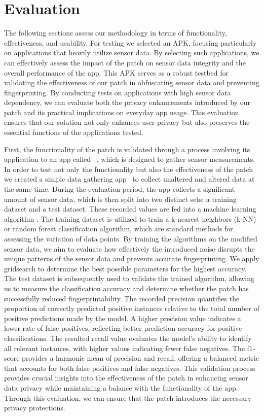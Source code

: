 \documentclass[11pt,
  oneside,openany,    %
]{scrreprt}
\begin{document}
\chapter{Evaluation}
\label{chap:evaluation}
The following sections assess our methodology in terms of functionality, effectiveness, and usability. 
For testing we selected an APK, focusing particularly on applications that heavily utilize sensor data.
By selecting such applications, we can effectively assess the impact of the patch on sensor data integrity and the overall performance of the app.
This APK serves as a robust testbed for validating the effectiveness of our patch in obfuscating sensor data and preventing fingerprinting.
By conducting tests on applications with high sensor data dependency, we can evaluate both the privacy enhancements introduced by our patch and its practical implications on everyday app usage.
This evaluation ensures that our solution not only enhances user privacy but also preserves the essential functions of the applications tested.

First, the functionality of the patch is validated through a process involving its application to an app called ~\cite{SensorBox}, which is designed to gather sensor measurements.
In order to test not only the functionality but also the effectiveness of the patch we created a simple data gathering app~\cite{sensorprint} to collect unaltered and altered data at the same time. 
During the evaluation period, the app collects a significant amount of sensor data, which is then split into two distinct sets: a training dataset and a test dataset.
These recorded values are fed into a machine learning algorithm \cite{DBLP:journals/tifs/AmeriniBCMN17}.
The training dataset is utilized to train a k-nearest neighbors (k-NN) or random forest classification algorithm, which are standard methods for assessing the variation of data points.
By training the algorithms on the modified sensor data, we aim to evaluate how effectively the introduced noise disrupts the unique patterns of the sensor data and prevents accurate fingerprinting.
We apply gridsearch to determine the best possible parameters for the highest accuracy.
The test dataset is subsequently used to validate the trained algorithm, allowing us to measure the classification accuracy and determine whether the patch has successfully reduced fingerprintability.
The recorded precision quantifies the proportion of correctly predicted positive instances relative to the total number of positive predictions made by the model.
A higher precision value indicates a lower rate of false positives, reflecting better prediction accuracy for positive classifications.
The resulted recall value evaluates the model's ability to identify all relevant instances, with higher values indicating fewer false negatives.
The f1-score provides a harmonic mean of precision and recall, offering a balanced metric that accounts for both false positives and false negatives.
This validation process provides crucial insights into the effectiveness of the patch in enhancing sensor data privacy while maintaining a balance with the functionality of the app.
Through this evaluation, we can ensure that the patch introduces the necessary privacy protections.
\end{document}
